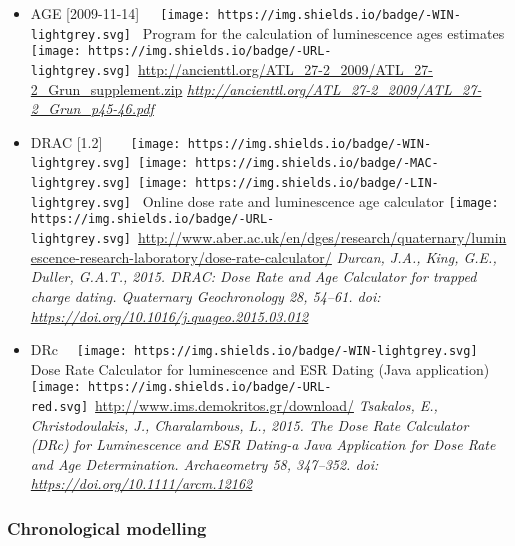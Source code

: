 \documentclass[]{article}
\providecommand{\tightlist}{%
  \setlength{\itemsep}{0pt}\setlength{\parskip}{0pt}}
\begin{document}
\begin{itemize}
\tightlist
\item
  AGE {[}2009-11-14{]}~~~\texttt{[image: https://img.shields.io/badge/-WIN-lightgrey.svg]}~
  Program for the calculation of luminescence ages estimates
  \texttt{[image: https://img.shields.io/badge/-URL-lightgrey.svg]}~\url{http://ancienttl.org/ATL_27-2_2009/ATL_27-2_Grun_supplement.zip}
  \emph{\url{http://ancienttl.org/ATL_27-2_2009/ATL_27-2_Grun_p45-46.pdf}}
\item
  DRAC {[}1.2{]}~~~~\texttt{[image: https://img.shields.io/badge/-WIN-lightgrey.svg]}~\texttt{[image: https://img.shields.io/badge/-MAC-lightgrey.svg]}~\texttt{[image: https://img.shields.io/badge/-LIN-lightgrey.svg]}~
  Online dose rate and luminescence age calculator
  \texttt{[image: https://img.shields.io/badge/-URL-lightgrey.svg]}~\url{http://www.aber.ac.uk/en/dges/research/quaternary/luminescence-research-laboratory/dose-rate-calculator/}
  \emph{Durcan, J.A., King, G.E., Duller, G.A.T., 2015. DRAC: Dose Rate and Age Calculator for trapped charge dating. Quaternary Geochronology 28, 54--61. doi: \url{https://doi.org/10.1016/j.quageo.2015.03.012}}
\item
  DRc ~~\texttt{[image: https://img.shields.io/badge/-WIN-lightgrey.svg]}~
  Dose Rate Calculator for luminescence and ESR Dating (Java application)
  \texttt{[image: https://img.shields.io/badge/-URL-red.svg]}~\url{http://www.ims.demokritos.gr/download/}
  \emph{Tsakalos, E., Christodoulakis, J., Charalambous, L., 2015. The Dose Rate Calculator (DRc) for Luminescence and ESR Dating-a Java Application for Dose Rate and Age Determination. Archaeometry 58, 347--352. doi: \url{https://doi.org/10.1111/arcm.12162}}
\end{itemize}

\hypertarget{chronological-modelling}{%
\subsubsection{Chronological modelling}\label{chronological-modelling}}
\end{document}
